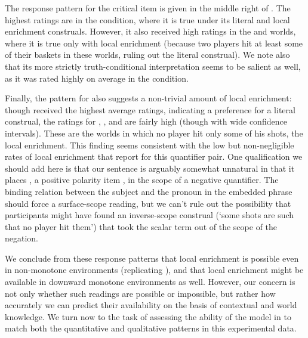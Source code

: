 \documentclass[leqno,12pt]{article}
\begin{document}
The response pattern for the critical item  is given in the
middle right of . The highest ratings are in
the  condition, where it is true under its literal and
local enrichment construals. However, it also received high ratings in
the  and  worlds, where it is true only with
local enrichment (because two players hit at least some of their
baskets in these worlds, ruling out the literal construal).  We note
also that its more strictly truth-conditional interpretation seems to
be salient as well, as it was rated highly on average in the
 condition.

Finally, the pattern for  also suggests a non-trivial
amount of local enrichment: though  received the highest
average ratings, indicating a preference for a literal construal, the
ratings for , , and  are fairly high
(though with wide confidence intervals). These are the worlds in which
no player hit only some of his shots, the local enrichment. This
finding seems consistent with the low but non-negligible rates of
local enrichment that  report for
this quantifier pair. One qualification we should add here is that our
sentence is arguably somewhat unnatural in that it places ,
a positive polarity item \citep{Baker70,Israel96}, in the scope of a
negative quantifier. The binding relation between the subject and the
pronoun  in the embedded phrase should force a surface-scope
reading, but we can't rule out the possibility that participants might
have found an inverse-scope construal (`some shots are such that no
player hit them') that took the scalar term out of the scope of the
negation.

We conclude from these response patterns that local enrichment is
possible even in non-monotone environments (replicating
\citet{Chemla:Spector:2011}), and that local enrichment might be
available in downward monotone environments as well. However, our
concern is not only whether such readings are possible or
impossible, but rather how accurately we can predict
their availability on the basis of contextual and world knowledge. 
We turn now to the task of
assessing the ability of the model in  to match
both the quantitative and qualitative patterns in this experimental
data.
\end{document}

